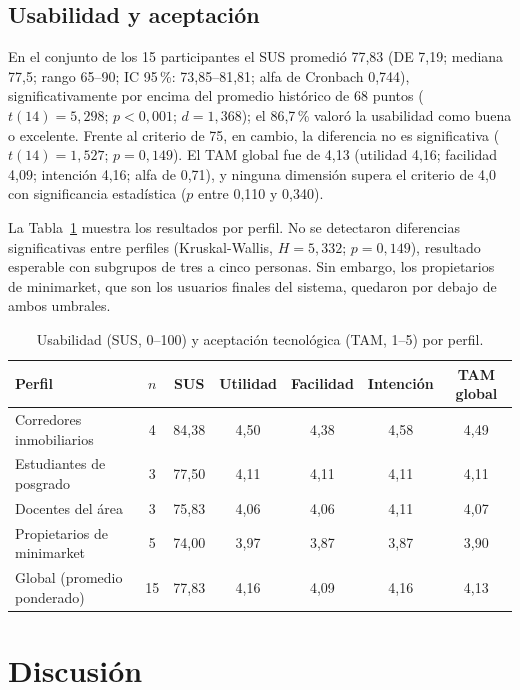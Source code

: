 \documentclass[10pt,letterpaper,twocolumn]{article}
\begin{document}
\subsection{Usabilidad y aceptación}

En el conjunto de los 15 participantes el SUS promedió 77,83 (DE 7,19; mediana 77,5; rango 65--90; IC 95\,\%: 73,85--81,81; alfa de Cronbach 0,744), significativamente por encima del promedio histórico de 68 puntos ($t(14)=5{,}298$; $p<0{,}001$; $d=1{,}368$); el 86,7\,\% valoró la usabilidad como buena o excelente. Frente al criterio de 75, en cambio, la diferencia no es significativa ($t(14)=1{,}527$; $p=0{,}149$). El TAM global fue de 4,13 (utilidad 4,16; facilidad 4,09; intención 4,16; alfa de 0,71), y ninguna dimensión supera el criterio de 4,0 con significancia estadística ($p$ entre 0,110 y 0,340).

La Tabla~\ref{tab:sus} muestra los resultados por perfil. No se detectaron diferencias significativas entre perfiles (Kruskal-Wallis, $H=5{,}332$; $p=0{,}149$), resultado esperable con subgrupos de tres a cinco personas. Sin embargo, los propietarios de minimarket, que son los usuarios finales del sistema, quedaron por debajo de ambos umbrales.

\begin{table}[t]
\centering
\caption{Usabilidad (SUS, 0--100) y aceptación tecnológica (TAM, 1--5) por perfil.}
\label{tab:sus}
\small
\begin{tabular}{lcccccc}
\toprule
Perfil & $n$ & SUS & Utilidad & Facilidad & Intención & TAM global \\
\midrule
Corredores inmobiliarios & 4 & 84,38 & 4,50 & 4,38 & 4,58 & 4,49 \\
Estudiantes de posgrado & 3 & 77,50 & 4,11 & 4,11 & 4,11 & 4,11 \\
Docentes del área & 3 & 75,83 & 4,06 & 4,06 & 4,11 & 4,07 \\
Propietarios de minimarket & 5 & 74,00 & 3,97 & 3,87 & 3,87 & 3,90 \\
\midrule
Global (promedio ponderado) & 15 & 77,83 & 4,16 & 4,09 & 4,16 & 4,13 \\
\bottomrule
\end{tabular}
\end{table}

\section{Discusión}
\end{document}
